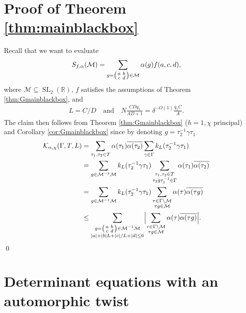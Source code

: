 \documentclass[12pt]{amsart}
\theoremstyle{definition}
\theoremstyle{remark}
\numberwithin{equation}{section}
\newcommand{\R}{{\mathbb R}}
\newcommand{\1}{{\mathbf 1}}
\newcommand{\SL}{\operatorname{SL}_2}
\renewcommand{\c}{\mathfrak c}
\begin{document}
\section{Proof of Theorem \ref{thm:mainblackbox}}\label{sec:proofmainblack} Recall that we want to evaluate
\begin{align*}
      S_{f,\alpha}(\mathcal{M}) = \sum_{g=\smqty(a & b \\c& d) \in \mathcal{M}}  \alpha(g) f(a,c,d) ,
\end{align*}
where $\mathcal{M} \subseteq \SL(\R)$, $f$ satisfies the assumptions of Theorem \ref{thm:Gmainblackbox}, and
\begin{align*}
    L= C/D \quad \text{and} \quad N \frac{CD q_1}{AD+ 1} = \delta^{-O(1)} \frac{q_1 C}{A}.
\end{align*}
The claim then follows from Theorem \ref{thm:Gmainblackbox} ($h=1,\chi$ principal) and Corollary \ref{cor:Gmainblackbox} since by denoting $g= \tau_2^{-1} \gamma\tau_1$
\begin{align*}
    \mathcal{K}_{\alpha,\chi}(\Gamma,T,L)&=   \sum_{\tau_1, \tau_2 \in T} \alpha(\tau_1)  \overline{\alpha(\tau_2)}\sum_{\gamma \in \Gamma} k_L(\tau_2^{-1} \gamma\tau_1  ) \\
    & = \sum_{g \in \mathcal{M}^{-1}\mathcal{M}} k_L(\tau_2^{-1} \gamma\tau_1  )  \sum_{\substack{\tau_1, \tau_2 \in T \\ \tau_2 g \tau_1^{-1} \in \Gamma}} \alpha(\tau_1)  \overline{\alpha(\tau_2)}  \\
   & = \sum_{g \in \mathcal{M}^{-1}\mathcal{M}} k_L(\tau_2^{-1} \gamma\tau_1  )  \sum_{ \substack{\tau\in \Gamma \backslash \mathcal{M} 
 \\ \tau g \in \mathcal{M}}} \alpha(\tau) \overline{\alpha(\tau g)}  \\
    & \leq \sum_{\substack{g =\smqty(a & b \\c & d) \in \mathcal{M}^{-1} \mathcal{M} \\  |a|+|b| L +|c|/L+|d| \leq 6}}\Bigl|\sum_{ \substack{\tau\in \Gamma \backslash \mathcal{M} 
 \\ \tau g \in \mathcal{M}}} \alpha(\tau) \overline{\alpha(\tau g)} \Bigr|.
\end{align*}
\qed

\section{Determinant equations with an automorphic twist}
\end{document}
